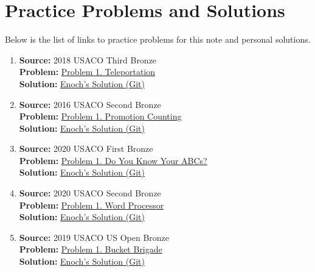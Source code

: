 \documentclass[../../main.tex]{subfiles}
\begin{document}
\section{Practice Problems and Solutions}

Below is the list of links to practice problems for this note
and personal solutions.

\begin{enumerate}
\item
\textbf{Source:} 2018 USACO Third Bronze \\
\textbf{Problem:}
\href{https://usaco.org/index.php?page=viewproblem2\&cpid=807}{Problem 1. Teleportation} \\
\textbf{Solution:}
\href{https://github.com/enochyu-official/LibreNotebook/blob/main/src/CS02/CS0201/CS0201.26054-01.cpp}{Enoch's Solution (Git)}

\item
\textbf{Source:} 2016 USACO Second Bronze \\
\textbf{Problem:}
\href{https://usaco.org/index.php?page=viewproblem2\&cpid=591}{Problem 1. Promotion Counting} \\
\textbf{Solution:}
\href{https://github.com/enochyu-official/LibreNotebook/blob/main/src/CS02/CS0201/CS0201.26054-02.cpp}{Enoch's Solution (Git)}

\item
\textbf{Source:} 2020 USACO First Bronze \\
\textbf{Problem:}
\href{https://usaco.org/index.php?page=viewproblem2\&cpid=1059}{Problem 1. Do You Know Your ABCs?} \\
\textbf{Solution:}
\href{https://github.com/enochyu-official/LibreNotebook/blob/main/src/CS02/CS0201/CS0201.26054-03.cpp}{Enoch's Solution (Git)}

\item
\textbf{Source:} 2020 USACO Second Bronze \\
\textbf{Problem:}
\href{https://usaco.org/index.php?page=viewproblem2\&cpid=987}{Problem 1. Word Processor} \\
\textbf{Solution:}
\href{https://github.com/enochyu-official/LibreNotebook/blob/main/src/CS02/CS0201/CS0201.26054-04.cpp}{Enoch's Solution (Git)}

\item
\textbf{Source:} 2019 USACO US Open Bronze \\
\textbf{Problem:}
\href{https://usaco.org/index.php?page=viewproblem2\&cpid=939}{Problem 1. Bucket Brigade} \\
\textbf{Solution:}
\href{https://github.com/enochyu-official/LibreNotebook/blob/main/src/CS02/CS0201/CS0201.26054-05.cpp}{Enoch's Solution (Git)}


\end{enumerate}
\end{document}
